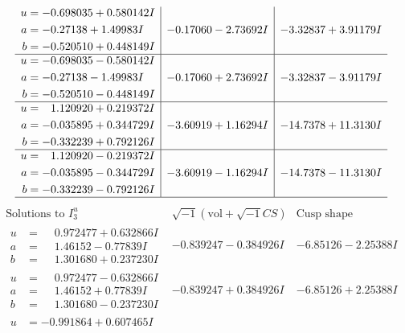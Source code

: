 \documentclass[1p]{elsarticle_modified}
\theoremstyle{definition}
\newcommand{\I}{\sqrt{-1}}
\begin{document}
$$\begin{array}{c|c|c}
\begin{aligned}
u &= -0.698035 + 0.580142 I \\
a &= -0.27138 + 1.49983 I \\
b &= -0.520510 + 0.448149 I\end{aligned}
 & -0.17060 - 2.73692 I & -3.32837 + 3.91179 I \\ \hline\begin{aligned}
u &= -0.698035 - 0.580142 I \\
a &= -0.27138 - 1.49983 I \\
b &= -0.520510 - 0.448149 I\end{aligned}
 & -0.17060 + 2.73692 I & -3.32837 - 3.91179 I \\ \hline\begin{aligned}
u &= \phantom{-}1.120920 + 0.219372 I \\
a &= -0.035895 + 0.344729 I \\
b &= -0.332239 + 0.792126 I\end{aligned}
 & -3.60919 + 1.16294 I & -14.7378 + 11.3130 I \\ \hline\begin{aligned}
u &= \phantom{-}1.120920 - 0.219372 I \\
a &= -0.035895 - 0.344729 I \\
b &= -0.332239 - 0.792126 I\end{aligned}
 & -3.60919 - 1.16294 I & -14.7378 - 11.3130 I\\
 \hline 
 \end{array}$$\newpage$$\begin{array}{c|c|c}  
\text{Solutions to }I^u_{3}& \I (\text{vol} + \sqrt{-1}CS) & \text{Cusp shape}\\
 \hline 
\begin{aligned}
u &= \phantom{-}0.972477 + 0.632866 I \\
a &= \phantom{-}1.46152 - 0.77839 I \\
b &= \phantom{-}1.301680 + 0.237230 I\end{aligned}
 & -0.839247 - 0.384926 I & -6.85126 - 2.25388 I \\ \hline\begin{aligned}
u &= \phantom{-}0.972477 - 0.632866 I \\
a &= \phantom{-}1.46152 + 0.77839 I \\
b &= \phantom{-}1.301680 - 0.237230 I\end{aligned}
 & -0.839247 + 0.384926 I & -6.85126 + 2.25388 I \\ \hline\begin{aligned}
u &= -0.991864 + 0.607465 I \\

\end{aligned}
\end{array}$$
\end{document}
